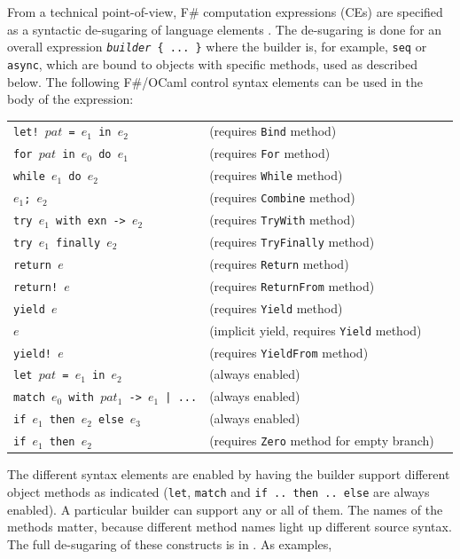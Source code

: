 \documentclass[acmsmall,screen]{acmart}
\begin{document}
From a technical point-of-view, F\# computation expressions (CEs) are specified as a syntactic de-sugaring of language elements \citep{RefLangSpec}.
The de-sugaring is done for an overall expression \texttt{\textit{builder} \{ ... \}} where the builder is, for example, \texttt{seq} or \texttt{async},
which are bound to objects with specific methods, used as described below.
The following F\#/OCaml control syntax elements can be used in the body of the expression:

\begin{center}
\begin{tabular}{lll}
 \texttt{let! $pat$ = $e_1$ in $e_2$} & (requires \texttt{Bind} method) \\
\texttt{for $pat$ in $e_0$ do  $e_1$} & (requires \texttt{For} method) \\
\texttt{while $e_1$ do  $e_2$ }  & (requires \texttt{While} method) \\
\texttt{$e_1$; $e_2$}  & (requires \texttt{Combine} method) \\
\texttt{try $e_1$ with exn -> $e_2$} &  (requires \texttt{TryWith} method) \\
 \texttt{try $e_1$ finally $e_2$}  & (requires \texttt{TryFinally} method) \\
 \texttt{return $e$}  & (requires \texttt{Return} method) \\
 \texttt{return! $e$} &  (requires \texttt{ReturnFrom} method) \\
 \texttt{yield $e$}  & (requires \texttt{Yield} method) \\
 \texttt{$e$}  & (implicit yield, requires \texttt{Yield} method) \\
 \texttt{yield! $e$} &  (requires \texttt{YieldFrom} method) \\
 \texttt{let $pat$ = $e_1$ in $e_2$}  & (always enabled) \\
 \texttt{match $e_0$ with $pat_1$ -> $e_1$ | ...}  & (always enabled)  \\
 \texttt{if $e_1$ then $e_2$ else $e_3$}  & (always enabled)  \\
 \texttt{if $e_1$ then $e_2$} &  (requires \texttt{Zero} method for empty branch) \\
\end{tabular}
\end{center}

\noindent The different syntax elements are enabled by having the builder support different
object methods as indicated (\texttt{let}, \texttt{match} and \texttt{if .. then .. else} are always enabled). 
A particular builder can support any or all of
them. The names of the methods matter, because different method names light up different source syntax. 
The full de-sugaring of these constructs is in \citet{RefLangSpec}.  As examples,
\end{document}
